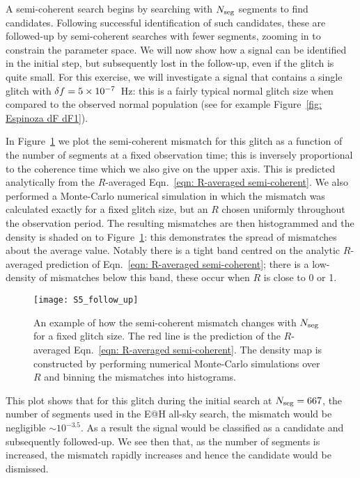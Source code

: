 \documentclass[../full_thesis/full_thesis.tex]{subfiles}
\begin{document}
A semi-coherent search begins by searching with $N_{\textrm{seg}}$ segments to
find candidates. Following successful identification of such candidates, these
are followed-up by semi-coherent searches with fewer segments, zooming in to
constrain the parameter space. We will now show how a signal can
be identified in the initial step, but subsequently lost in the follow-up, even
if the glitch is quite small. For this exercise, we will investigate a signal
that contains a single glitch with $\delta f=5\times10^{-7}$~Hz: this is a
fairly typical normal glitch size when compared to the observed normal population (see for
example Figure~\ref{fig: Espinoza dF dF1}).

In Figure~\ref{fig: follow-up} we plot the semi-coherent mismatch for this
glitch as a function of the number of segments at a fixed observation time; this
is inversely proportional to the coherence time which we also give on the upper
axis. This is predicted
analytically from the $R$-averaged Eqn.~\eqref{eqn: R-averaged semi-coherent}.
We also performed a Monte-Carlo numerical simulation in which the mismatch was
calculated exactly for a fixed glitch size, but an $R$ chosen uniformly
throughout the observation period. The resulting mismatches are then histogrammed and the
density is shaded on to Figure~\ref{fig: follow-up}: this demonstrates the spread of
mismatches about the average value. Notably there is a tight band centred on
the analytic $R$-averaged prediction of Eqn.~\eqref{eqn: R-averaged semi-coherent};
there is a low-density of mismatches below this band, these occur when $R$ is
close to 0 or 1.

\begin{figure}[htb]
\centering
\texttt{[image: S5\_follow\_up]}
\caption{An example of how the semi-coherent mismatch changes with $N_{\textrm{seg}}$ for
         a fixed glitch size. The red line is the prediction of the $R$-averaged
         Eqn.~\eqref{eqn: R-averaged semi-coherent}. The density map is constructed
         by performing numerical Monte-Carlo simulations over $R$ and binning the mismatches
         into histograms.}
\label{fig: follow-up}
\end{figure}
This plot shows that for this glitch during the initial search at $N_{\textrm{seg}}=667$,
the number of segments used in the E@H all-sky search, the mismatch would be
negligible $\sim10^{-3.5}$. As a result the signal would be classified as a
candidate and subsequently followed-up. We see then that, as the number of
segments is increased, the mismatch rapidly increases and hence the candidate
would be dismissed.
\end{document}
